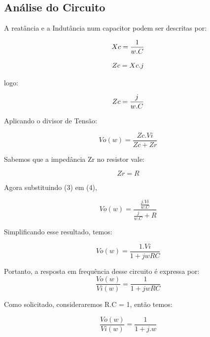 \documentclass[12pt]{article}
\begin{document}

 
 \subsection{Análise do Circuito}
A reatância e a Indutância num capacitor podem ser descritas por:

\begin{equation}
Xc = \frac{1}{w.C}\\
\end{equation}

\begin{equation}
Zc = Xc.j\\
\end{equation}

logo:

\begin{equation}
Zc = \frac{j}{w.C}\\
\end{equation}

Aplicando o divisor de Tensão:

\begin{equation}
Vo(w)=\frac{Zc.Vi}{Zc+Zr}
\end{equation}

Sabemos que a impedância Zr no resistor vale:

\begin{equation}
Zr= R
\end{equation}


Agora substituindo (3) em (4), 

\begin{equation}
Vo(w)=\frac{\frac{j.Vi}{w.C}}{\frac{j}{w.C} + R}
\end{equation}

Simplificando esse resultado, temos: 

\begin{equation}
Vo(w)=\frac{1.Vi}{1+jwRC}
\end{equation}

Portanto, a resposta em frequência desse circuito é expressa por:
\begin{equation}
\frac{Vo(w)}{Vi(w)}=\frac{1}{1+jwRC}
\end{equation}

Como solicitado, consideraremos R.C = 1, então temos:

\begin{equation}
\frac{Vo(w)}{Vi(w)}=\frac{1}{1+j.w}
\end{equation}
\end{document}
